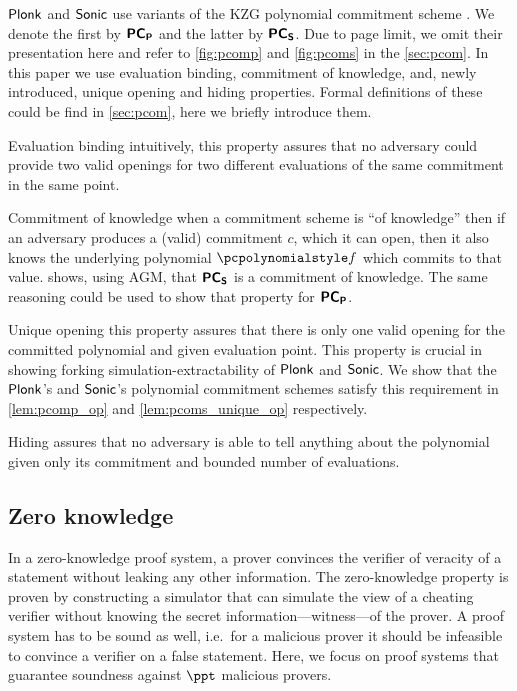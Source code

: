\documentclass[runningheads,11pt]{llncs}
\begin{document}
$\textnormal{\textsf{Plonk}}$ and ${\textnormal{\textsf{Sonic}}}$ use variants of the KZG polynomial commitment scheme
\cite{AC:KatZavGol10}. We denote the first by $\bm{\mathsf{PC}}_{\bm{\mathsf{P}}}$ and the latter by
$\bm{\mathsf{PC}}_{\bm{\mathsf{S}}}$. Due to page limit, we omit their presentation here and refer to
\cref{fig:pcomp} and \cref{fig:pcoms} in the \cref{sec:pcom}.  In this paper we
use evaluation binding, commitment of knowledge, and, newly introduced, unique
opening and hiding properties. Formal definitions of these could be find in
\cref{sec:pcom}, here we briefly introduce them.
\begin{compactdesc}
  \item[Evaluation binding] intuitively, this property assures that no adversary
    could provide two valid openings for two different evaluations of the same
    commitment in the same point. 
  \item[Commitment of knowledge] when a commitment scheme is ``of
    knowledge'' then if an adversary produces a (valid) commitment $c$, which it
    can open, then it also knows the underlying polynomial $\p{f}$ which commits
    to that value.  \cite{CCS:MBKM19} shows, using AGM, that $\bm{\mathsf{PC}}_{\bm{\mathsf{S}}}$ is a
    commitment of knowledge.  The same reasoning could be used to show that
    property for $\bm{\mathsf{PC}}_{\bm{\mathsf{P}}}$.
  \item[Unique opening] this property assures that there is
    only one valid opening for the committed polynomial and given evaluation
    point. This property is crucial in showing forking simulation-extractability
    of $\textnormal{\textsf{Plonk}}$ and ${\textnormal{\textsf{Sonic}}}$. We show that the $\textnormal{\textsf{Plonk}}$'s and ${\textnormal{\textsf{Sonic}}}$'s
    polynomial commitment schemes satisfy this requirement in
    \cref{lem:pcomp_op} and \cref{lem:pcoms_unique_op} respectively.
  \item[Hiding] assures that no adversary is able to tell anything about the
    polynomial given only its commitment and bounded number of evaluations.
\end{compactdesc}


\subsection{Zero knowledge}
In a zero-knowledge proof system, a prover convinces the verifier of veracity of
a statement without leaking any other information. The zero-knowledge property
is proven by constructing a simulator that can simulate the view of a cheating
verifier without knowing the secret information---witness---of the prover. A
proof system has to be sound as well, i.e.~for a malicious prover it should be
infeasible to convince a verifier on a false statement. Here, we focus on proof
systems that guarantee soundness against $\ppt$ malicious provers.
\end{document}
